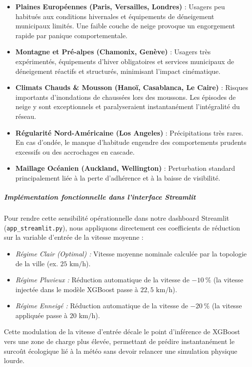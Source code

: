 \documentclass[10pt, a4paper]{article}
\providecommand{\tightlist}{}
\begin{document}
\begin{itemize}
\tightlist
\item
  \textbf{Plaines Européennes (Paris, Versailles, Londres)} : Usagers
  peu habitués aux conditions hivernales et équipements de déneigement
  municipaux limités. Une faible couche de neige provoque un engorgement
  rapide par panique comportementale.
\item
  \textbf{Montagne et Pré-alpes (Chamonix, Genève)} : Usagers très
  expérimentés, équipements d'hiver obligatoires et services municipaux
  de déneigement réactifs et structurés, minimisant l'impact
  cinématique.
\item
  \textbf{Climats Chauds \& Mousson (Hanoï, Casablanca, Le Caire)} :
  Risques importants d'inondations de chaussées lors des moussons. Les
  épisodes de neige y sont exceptionnels et paralyseraient
  instantanément l'intégralité du réseau.
\item
  \textbf{Régularité Nord-Américaine (Los Angeles)} : Précipitations
  très rares. En cas d'ondée, le manque d'habitude engendre des
  comportements prudents excessifs ou des accrochages en cascade.
\item
  \textbf{Maillage Océanien (Auckland, Wellington)} : Perturbation
  standard principalement liée à la perte d'adhérence et à la baisse de
  visibilité.
\end{itemize}

\subparagraph{Implémentation fonctionnelle dans l'interface
Streamlit}\label{impluxe9mentation-fonctionnelle-dans-linterface-streamlit}

Pour rendre cette sensibilité opérationnelle dans notre dashboard
Streamlit (\texttt{app\_streamlit.py}), nous appliquons directement ces
coefficients de réduction sur la variable d'entrée de la vitesse moyenne
:

\begin{itemize}
\tightlist
\item
  \emph{Régime Clair (Optimal) :} Vitesse moyenne nominale calculée par
  la topologie de la ville (ex. \(25\text{ km/h}\)).
\item
  \emph{Régime Pluvieux :} Réduction automatique de la vitesse de
  \(-10\ \%\) (la vitesse injectée dans le modèle XGBoost passe à
  \(22,5\text{ km/h}\)).
\item
  \emph{Régime Enneigé :} Réduction automatique de la vitesse de
  \(-20\ \%\) (la vitesse appliquée passe à \(20\text{ km/h}\)).
\end{itemize}

Cette modulation de la vitesse d'entrée décale le point d'inférence de
XGBoost vers une zone de charge plus élevée, permettant de prédire
instantanément le surcoût écologique lié à la météo sans devoir relancer
une simulation physique lourde.
\end{document}

